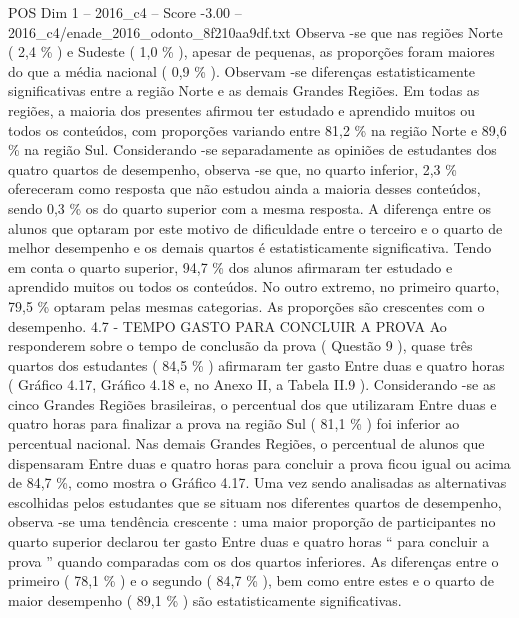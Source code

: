 \begin{textsample}{POS Dim 1 – 2016\_c4 – Score -3.00 – 2016\_c4/enade\_2016\_odonto\_8f210aa9df.txt}
Observa -se que nas regiões Norte ( 2,4 \% ) e Sudeste ( 1,0 \% ), apesar de pequenas, as proporções foram maiores do que a média nacional ( 0,9 \% ).
Observam -se diferenças estatisticamente significativas entre a região Norte e as demais Grandes Regiões.
Em todas as regiões, a maioria dos presentes afirmou ter estudado e aprendido muitos ou todos os conteúdos, com proporções variando entre 81,2 \% na região Norte e 89,6 \% na região Sul.
Considerando -se separadamente as opiniões de estudantes dos quatro quartos de desempenho, observa -se que, no quarto inferior, 2,3 \% ofereceram como resposta que não estudou ainda a maioria desses conteúdos, sendo 0,3 \% os do quarto superior com a mesma resposta.
A diferença entre os alunos que optaram por este motivo de dificuldade entre o terceiro e o quarto de melhor desempenho e os demais quartos é estatisticamente significativa.
Tendo em conta o quarto superior, 94,7 \% dos alunos afirmaram ter estudado e aprendido muitos ou todos os conteúdos.
No outro extremo, no primeiro quarto, 79,5 \% optaram pelas mesmas categorias.
As proporções são crescentes com o desempenho. 4.7 - TEMPO GASTO PARA CONCLUIR A PROVA Ao responderem sobre o tempo de conclusão da prova ( Questão 9 ), quase três quartos dos estudantes ( 84,5 \% ) afirmaram ter gasto Entre duas e quatro horas ( Gráfico 4.17, Gráfico 4.18 e, no Anexo II, a Tabela II.9 ).
Considerando -se as cinco Grandes Regiões brasileiras, o percentual dos que utilizaram Entre duas e quatro horas para finalizar a prova na região Sul ( 81,1 \% ) foi inferior ao percentual nacional.
Nas demais Grandes Regiões, o percentual de alunos que dispensaram Entre duas e quatro horas para concluir a prova ficou igual ou acima de 84,7 \%, como mostra o Gráfico 4.17.
Uma vez sendo analisadas as alternativas escolhidas pelos estudantes que se situam nos diferentes quartos de desempenho, observa -se uma tendência crescente : uma maior proporção de participantes no quarto superior declarou ter gasto Entre duas e quatro horas “ para concluir a prova ” quando comparadas com os dos quartos inferiores.
As diferenças entre o primeiro ( 78,1 \% ) e o segundo ( 84,7 \% ), bem como entre estes e o quarto de maior desempenho ( 89,1 \% ) são estatisticamente significativas.

\end{textsample}

